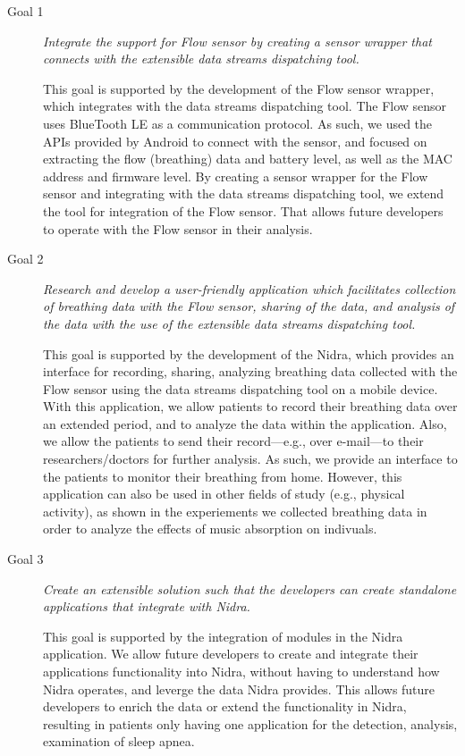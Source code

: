 \begin{description}
    \item[Goal 1] \textit{Integrate the support for Flow sensor by creating a sensor wrapper that connects with the extensible data streams dispatching tool.}

    This goal is supported by the development of the Flow sensor wrapper, which integrates with the data streams dispatching tool. The Flow sensor uses BlueTooth LE as a communication protocol. As such, we used the APIs provided by Android to connect with the sensor, and focused on extracting the flow (breathing) data and battery level, as well as the MAC address and firmware level. By creating a sensor wrapper for the Flow sensor and integrating with the data streams dispatching tool, we extend the tool for integration of the Flow sensor. That allows future developers to operate with the Flow sensor in their analysis.


    \item[Goal 2] \textit{Research and develop a user-friendly application which facilitates collection of breathing data with the Flow sensor, sharing of the data, and analysis of the data with the use of the extensible data streams dispatching tool.}

    This goal is supported by the development of the Nidra, which provides an interface for recording, sharing, analyzing breathing data collected with the Flow sensor using the data streams dispatching tool on a mobile device. With this application, we allow patients to record their breathing data over an extended period, and to analyze the data within the application. Also, we allow the patients to send their record---e.g., over e-mail---to their researchers/doctors for further analysis. As such, we provide an interface to the patients to monitor their breathing from home. However, this application can also be used in other fields of study (e.g., physical activity), as shown in the experiements we collected breathing data in order to analyze the effects of music absorption on indivuals.
    
    \item[Goal 3] \textit{Create an extensible solution such that the developers can create standalone applications that integrate with Nidra.}

    This goal is supported by the integration of modules in the Nidra application. We allow future developers to create and integrate their applications functionality into Nidra, without having to understand how Nidra operates, and leverge the data Nidra provides. This allows future developers to enrich the data or extend the functionality in Nidra, resulting in patients only having one application for the detection, analysis, examination of sleep apnea. 
\end{description}


